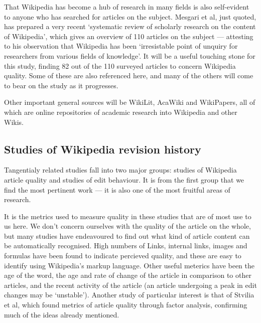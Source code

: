 That Wikipedia has become a hub of research in many fields is also
self-evident to anyone who has searched for articles on the
subject. Mesgari et al, just quoted, has prepared a very recent
`systematic review of scholarly research on the content of Wikipedia',
which gives an overview of 110 articles on the subject --- attesting
to his observation that Wikipedia has been `irresistable point of
unquiry for researchers from various fields of knowledge'. It will be
a useful touching stone for this study, finding 82 out of the 110
surveyed articles to concern Wikipedia quality. Some of these are also
referenced here, and many of the others will come to bear on the study
as it progresses.

Other important general sources will be WikiLit,\cite{wikilit}
AcaWiki\cite{acawiki} and WikiPapers\cite{wikipapers}, all of which
are online repositories of academic research into Wikipedia and other
Wikis.


\subsection*{Studies of Wikipedia revision history}
Tangentialy related studies fall into two major groups: studies of
Wikipedia article quality and studies of edit behaviour.  It is from
the first group that we find the most pertinent work --- it is also
one of the most fruitful areas of research.

It is the metrics used to measure quality in these studies that are of
most use to us here. We don't concern ourselves with the quality of
the article on the whole, but many studies have endeavoured to find
out what kind of article content can be automatically recognised. High
numbers of Links, internal links, images and formulas have been found
to indicate percieved quality,\cite{Lucassen2010}\cite{mcguinness2006}
and these are easy to identify using Wikipedia's markup
language. Other useful meterics have been the age of the
word,\cite{Cross2006} the age and rate of change of the article in
comparison to other articles,\cite{Zeng2006} and the recent activity
of the article (an article undergoing a peak in edit changes may be
`unstable').\cite{Adler2006} Another study of particular interest is
that of Stvilia et al, which found metrics of article quality through
factor analysis,\cite{Stvilia2005} confirming much of the ideas
already mentioned.

